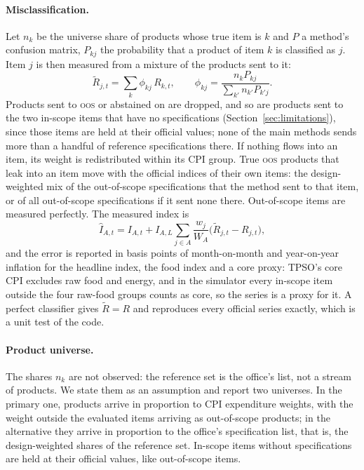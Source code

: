 \paragraph{Misclassification.} Let $n_k$ be the universe share of products whose true item is
$k$ and $P$ a method's confusion matrix, $P_{kj}$ the probability that a product of item $k$
is classified as $j$. Item $j$ is then measured from a mixture of the products sent to it:
\begin{equation}
\tilde R_{j,t} = \sum_k \phi_{kj}\, R_{k,t}, \qquad
\phi_{kj} = \frac{n_k P_{kj}}{\sum_{k'} n_{k'} P_{k'j}}.
\label{eq:mix}
\end{equation}
Products sent to \textsc{oos} or abstained on are dropped, and so are products sent to the
two in-scope items that have no specifications (Section~\ref{sec:limitations}), since those
items are held at their official values; none of the main methods sends more than a handful
of reference specifications there. If nothing flows into an item, its weight is
redistributed within its CPI group. True \textsc{oos} products that leak into an item move
with the official indices of their own items: the design-weighted mix of the out-of-scope
specifications that the method sent to that item, or of all out-of-scope specifications if
it sent none there. Out-of-scope items are measured perfectly. The
measured index is
\begin{equation}
\hat I_{A,t} = I_{A,t} + I_{A,L} \sum_{j \in A} \frac{w_j}{W_A}
\bigl(\tilde R_{j,t} - R_{j,t}\bigr),
\label{eq:measured}
\end{equation}
and the error is reported in basis points of month-on-month and year-on-year inflation for
the headline index, the food index and a core proxy: TPSO's core CPI excludes raw food and
energy, and in the simulator every in-scope item outside the four raw-food groups counts as
core, so the series is a proxy for it. A perfect classifier gives $\tilde R = R$ and reproduces
every official series exactly, which is a unit test of the code.

\paragraph{Product universe.} The shares $n_k$ are not observed: the reference set is the
office's list, not a stream of products. We state them as an assumption and report two
universes. In the primary one, products arrive in proportion to CPI expenditure weights,
with the weight outside the evaluated items arriving as out-of-scope products; in the
alternative they arrive in proportion to the office's specification list, that is, the
design-weighted shares of the reference set. In-scope items without specifications are held
at their official values, like out-of-scope items.

